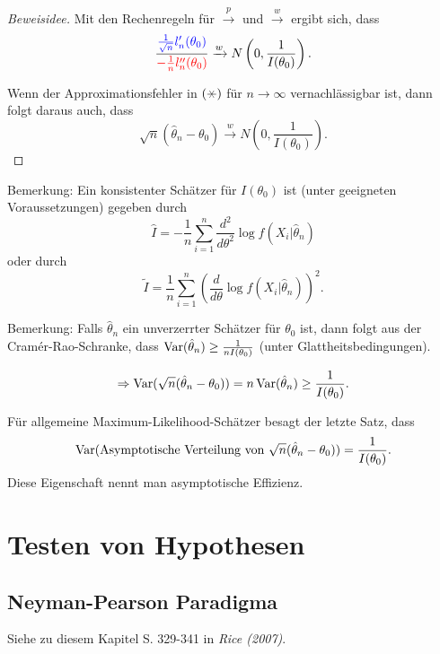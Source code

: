 \documentclass{tstextbook}
\begin{document}
\begin{proof}[Beweisidee]
		Mit den Rechenregeln für $ \xrightarrow{p} $ und $ \xrightarrow{w} $ ergibt sich, dass
		\[
		\frac{\textcolor{blue}{\frac{1}{\sqrt{n}}l_n^\prime(\theta_0)}}{\textcolor{red}{-\frac{1}{n}l_n^{\prime\prime}(\theta_0)}} \xrightarrow{w} N\left(0,\frac{1}{I(\theta_0)}\right).
		\]
		
		Wenn der Approximationsfehler in $ (\hexstar) $ für $ n\to\infty $ vernachlässigbar ist, dann folgt daraus auch, dass 
		\[
		\sqrt{n}(\hat{\theta}_n-\theta_0) \xrightarrow{w} N\left(0,\frac{1}{I(\theta_0)}\right).
		\]
	\end{proof}
	
	\begin{remark}
		Bemerkung: Ein konsistenter Schätzer für $ I(\theta_0) $ ist (unter geeigneten Voraussetzungen) gegeben durch 
		\[
		\hat{I} = -\frac{1}{n}\sum_{i=1}^{n}\frac{d^2}{d\theta^2}\log f(X_i|\hat{\theta}_n)
		\] oder durch
		\[
		\tilde{I} = \frac{1}{n}\sum_{i=1}^{n}\left(\frac{d}{d\theta}\log f(X_i|\hat{\theta}_n)\right)^2.
		\]
	\end{remark}

	\begin{remark}
		Bemerkung: Falls $ \hat{\theta}_n $ ein unverzerrter Schätzer für $ \theta_0 $ ist, dann folgt aus der Cramér-Rao-Schranke, dass $ \operatorname{Var}(\hat{\theta}_n) \ge \frac{1}{nI(\theta_0)}$ (unter Glattheitsbedingungen).
		
		\[ \Rightarrow \operatorname{Var}(\sqrt{n}(\hat{\theta}_n-\theta_0)) = n\operatorname{Var}(\hat{\theta}_n) \ge \frac{1}{I(\theta_0)} .
		\] 
		
		Für allgemeine Maximum-Likelihood-Schätzer besagt der letzte Satz, dass 
		\[
		\operatorname{Var}(\text{Asymptotische Verteilung von }\sqrt{n}(\hat{\theta}_n-\theta_0))=\frac{1}{I(\theta_0)}.
		\]
		Diese Eigenschaft nennt man asymptotische Effizienz.
		
	\end{remark}


\chapter{Testen von Hypothesen}

\section{Neyman-Pearson Paradigma}
	\begin{book}
	Siehe zu diesem Kapitel S. 329-341 in	\textit{Rice (2007)}.
\end{book}
\end{document}
